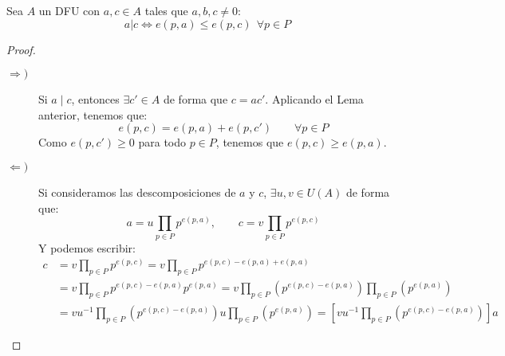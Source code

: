 \begin{lema}
    Sea $A$ un DFU con $a, c \in A$ tales que $a, b, c \neq 0$:
    $$a|c \Leftrightarrow e(p,a) \leq e(p,c)~~\forall p \in P$$
\begin{proof}
   \begin{description}
       \item [$\Longrightarrow)$] Si $a\mid c$, entonces $\exists c'\in A$ de forma que $c = ac'$. Aplicando el Lema anterior, tenemos que:
           \begin{equation*}
               e(p,c) = e(p,a) + e(p,c') \qquad \forall p\in P
           \end{equation*}
           Como $e(p,c') \geq 0$ para todo $p\in P$, tenemos que $e(p,c) \geq e(p,a)$.
       \item [$\Longleftarrow)$] Si consideramos las descomposiciones de $a$ y $c$, $\exists u,v\in U(A)$ de forma que:
           \begin{equation*}
               a = u\prod_{p\in P} p^{e(p,a)}, \qquad c = v\prod_{p\in P}p^{e(p,c)}
           \end{equation*}
           Y podemos escribir:
           \begin{align*}
               c &= v\prod_{p\in P}p^{e(p,c)}= v\prod_{p\in P}p^{e(p,c)-e(p,a)+e(p,a)} \\
                 &= v\prod_{p\in P}p^{e(p,c)-e(p,a)}p^{e(p,a)} = v\prod_{p\in P}\left(p^{e(p,c)-e(p,a)}\right) \prod_{p\in P}(p^{e(p,a)}) \\
                 &= vu^{-1} \prod_{p\in P}\left(p^{e(p,c)-e(p,a)}\right) u\prod_{p\in P}\left(p^{e(p,a)}\right) =\left[ vu^{-1} \prod_{p\in P}\left(p^{e(p,c)-e(p,a)}\right)\right] a
           \end{align*}
   \end{description}
\end{proof}
\end{lema}

